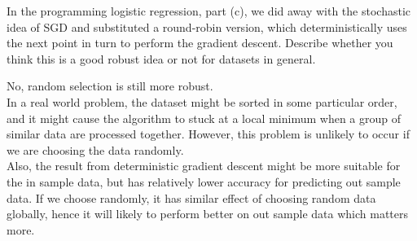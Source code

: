\documentclass[11pt,a4paper,answers]{exam}
\begin{document}
\begin{questions}
	\question
	In the programming logistic regression, part (c), we did away with the stochastic idea of SGD and substituted a round-robin version, which deterministically uses the next point in turn to perform the gradient descent. Describe whether you think this is a good robust idea or not for datasets in general.
	\begin{solution}
		No, random selection is still more robust.\\
		In a real world problem, the dataset might be sorted in some particular order, and it might cause
		the algorithm to stuck at a local minimum when a group of similar data are processed together.
		However, this problem is unlikely to occur if we are choosing the data randomly. \\
		Also, the result from deterministic gradient descent might be more suitable for the in sample data, but
		has relatively lower accuracy for predicting out sample data. If we choose randomly, it has similar
		effect of choosing random data globally, hence it will likely to 
		perform better on out sample data which matters more.
	\end{solution}
\end{questions}
\end{document}
